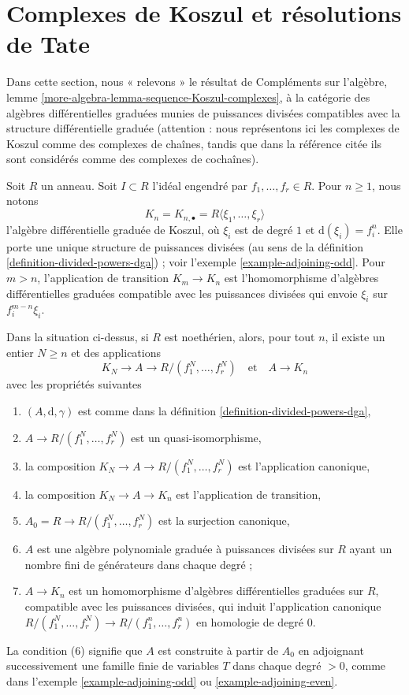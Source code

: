\section{Complexes de Koszul et résolutions de Tate}
\label{section-koszul-vs-tate}

\noindent
Dans cette section, nous « relevons » le résultat de
Compléments sur l'algèbre, lemme \ref{more-algebra-lemma-sequence-Koszul-complexes}, à la
catégorie des algèbres différentielles graduées munies de puissances divisées
compatibles avec la structure différentielle graduée (attention : nous représentons ici
les complexes de Koszul comme des complexes de chaînes, tandis que dans la référence
citée ils sont considérés comme des complexes de cochaînes).

\medskip\noindent
Soit $R$ un anneau. Soit $I \subset R$ l'idéal engendré
par $f_1, \ldots, f_r \in R$. Pour $n \geq 1$, nous notons
$$
K_n = K_{n, \bullet} = R\langle\xi_1, \ldots, \xi_r\rangle
$$
l'algèbre différentielle graduée de Koszul, où $\xi_i$ est de degré $1$ et
$\text{d}(\xi_i) = f_i^n$. Elle porte une unique structure de puissances divisées (au
sens de la définition \ref{definition-divided-powers-dga}) ; voir
l'exemple \ref{example-adjoining-odd}. Pour $m > n$, l'application de transition
$K_m \to K_n$ est l'homomorphisme d'algèbres différentielles graduées compatible
avec les puissances divisées qui envoie $\xi_i$ sur $f_i^{m - n}\xi_i$.

\begin{lemma}
\label{lemma-lift-tate-to-koszul}
Dans la situation ci-dessus, si $R$ est noethérien,
alors, pour tout $n$, il existe un entier $N \geq n$ et des applications
$$
K_N \to A \to R/(f_1^N, \ldots, f_r^N)\quad\text{et}\quad A \to K_n
$$
avec les propriétés suivantes
\begin{enumerate}
\item $(A, \text{d}, \gamma)$ est comme
dans la définition \ref{definition-divided-powers-dga},
\item $A \to R/(f_1^N, \ldots, f_r^N)$ est un quasi-isomorphisme,
\item la composition $K_N \to A \to R/(f_1^N, \ldots, f_r^N)$
est l'application canonique,
\item la composition $K_N \to A \to K_n$ est l'application de transition,
\item $A_0 = R \to R/(f_1^N, \ldots, f_r^N)$ est la
surjection canonique,
\item $A$ est une algèbre polynomiale graduée à puissances divisées sur $R$
ayant un nombre fini de générateurs dans chaque degré ;
\item $A \to K_n$ est un homomorphisme d'algèbres différentielles graduées sur $R$,
compatible avec les puissances divisées, qui induit l'application canonique
$R/(f_1^N, \ldots, f_r^N) \to R/(f_1^n, \ldots, f_r^n)$ en
homologie de degré $0$.
\end{enumerate}
La condition (6) signifie que $A$ est construite à partir de $A_0$ en
adjoignant successivement une famille finie de variables $T$ dans chaque degré
$> 0$, comme dans l'exemple \ref{example-adjoining-odd} ou \ref{example-adjoining-even}.
\end{lemma}

